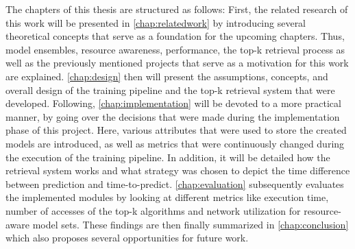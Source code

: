 The chapters of this thesis are structured as follows: First, the related research of this work will be presented in \autoref{chap:relatedwork} by introducing several theoretical concepts that serve as a foundation for the upcoming chapters. Thus, model ensembles, resource awareness, performance, the top-k retrieval process as well as the previously mentioned projects that serve as a motivation for this work are explained. \autoref{chap:design} then will present the assumptions, concepts, and overall design of the training pipeline and the top-k retrieval system that were developed. Following, \autoref{chap:implementation} will be devoted to a more practical manner, by going over the decisions that were made during the implementation phase of this project. Here, various attributes that were used to store the created models are introduced, as well as metrics that were continuously changed during the execution of the training pipeline. In addition, it will be detailed how the retrieval system works and what strategy was chosen to depict the time difference between prediction and time-to-predict. \autoref{chap:evaluation} subsequently evaluates the implemented modules by looking at different metrics like execution time, number of accesses of the top-k algorithms and network utilization for resource-aware model sets. These findings are then finally summarized in \autoref{chap:conclusion} which also proposes several opportunities for future work.